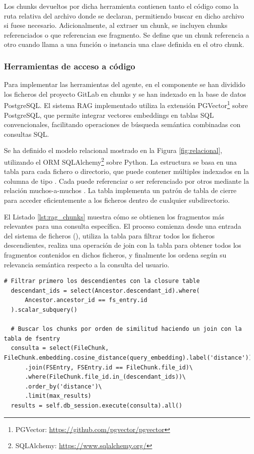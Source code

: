 Los chunks devueltos por dicha herramienta contienen tanto el código como la ruta relativa del archivo donde se declaran, permitiendo buscar en dicho archivo si fuese necesario. Adicionalmente, al extraer un chunk, se incluyen chunks referenciados o que referencian ese fragmento. Se define que un chunk referencia a otro cuando llama a una función o instancia una clase definida en el otro chunk. 

\subsubsection{Herramientas de acceso a código}
\label{sec:herramientas_codigo}
Para implementar las herramientas del agente, en el componente  se han dividido los ficheros del proyecto GitLab en chunks y se han indexado en la base de datos PostgreSQL. El sistema RAG implementado utiliza la extensión PGVector\footnote{PGVector: \url{https://github.com/pgvector/pgvector}} sobre PostgreSQL, que permite integrar vectores embeddings en tablas SQL convencionales, facilitando operaciones de búsqueda semántica combinadas con consultas SQL. 

Se ha definido el modelo relacional mostrado en la Figura \ref{fig:relacional}, utilizando el ORM SQLAlchemy\footnote{SQLAlchemy: \url{https://www.sqlalchemy.org/}} sobre Python. La estructura se basa en una tabla  para cada fichero o directorio, que puede contener múltiples  indexados en la columna  de tipo . Cada  puede referenciar o ser referenciado por otros  mediante la relación muchos-a-muchos . La tabla  implementa un patrón de tabla de cierre para acceder eficientemente a los ficheros dentro de cualquier subdirectorio.

El Listado \ref{lst:rag_chunks} muestra cómo se obtienen los fragmentos más relevantes para una consulta específica. El proceso comienza desde una entrada del sistema de ficheros (), utiliza la tabla  para filtrar todos los ficheros descendientes, realiza una operación de join con la tabla  para obtener todos los fragmentos contenidos en dichos ficheros, y finalmente los ordena según su relevancia semántica respecto a la consulta del usuario.

\begin{lstlisting}[caption={Obtener chunks relevantes para una consulta dentro de un subdirectorio específico}, label={lst:rag_chunks}]
  # Filtrar primero los descendientes con la closure table
  descendant_ids = select(Ancestor.descendant_id).where(
      Ancestor.ancestor_id == fs_entry.id
  ).scalar_subquery()

  # Buscar los chunks por orden de similitud haciendo un join con la tabla de fsentry
  consulta = select(FileChunk, FileChunk.embedding.cosine_distance(query_embedding).label('distance'))\
      .join(FSEntry, FSEntry.id == FileChunk.file_id)\
      .where(FileChunk.file_id.in_(descendant_ids))\
      .order_by('distance')\
      .limit(max_results)
  results = self.db_session.execute(consulta).all()
\end{lstlisting}


